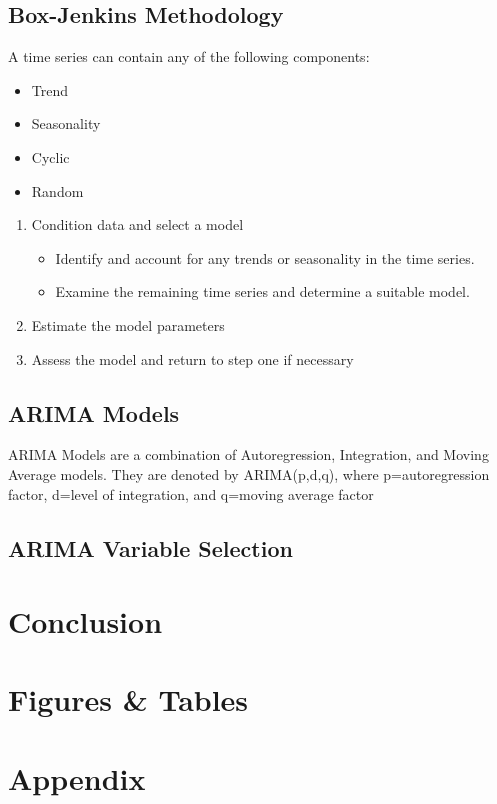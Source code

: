 \documentclass[12pt]{article}
\begin{document}
\subsection{Box-Jenkins Methodology}
  A time series can contain any of the following components:
  \begin{itemize}
    \item Trend
    \item Seasonality
    \item Cyclic
    \item Random
  \end{itemize}
  \begin{enumerate}
    \item Condition data and select a model
    \begin{itemize}
      \item Identify and account for any trends or seasonality in the time series.
      \item Examine the remaining time series and determine a suitable model.
    \end{itemize}
    \item Estimate the model parameters
    \item Assess the model and return to step one if necessary
  \end{enumerate}

\subsection{ARIMA Models}
  ARIMA Models are a combination of Autoregression, Integration, and Moving Average models. They are denoted by ARIMA(p,d,q), where p=autoregression factor, d=level of integration, and q=moving average factor

\subsection{ARIMA Variable Selection}


\pagebrea

\section{Conclusion}

\section{Figures \& Tables}




\section{Appendix}
\end{document}
